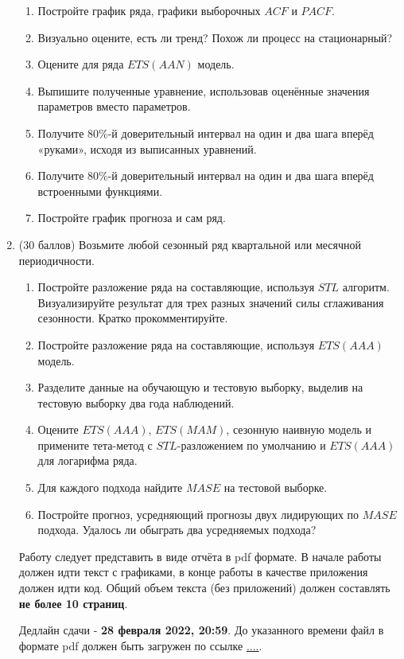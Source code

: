 \documentclass[12pt]{article}
\begin{document}
\begin{enumerate}
\begin{enumerate}
    \item Постройте график ряда, графики выборочных $ACF$ и $PACF$.
    \item Визуально оцените, есть ли тренд? Похож ли процесс на стационарный?
    \item Оцените для ряда $ETS(AAN)$ модель. 
    \item Выпишите полученные уравнение, использовав оценённые значения параметров вместо параметров.
    \item Получите 80\%-й доверительный интервал на один и два шага вперёд «руками», исходя из выписанных уравнений. 
    \item Получите 80\%-й доверительный интервал на один и два шага вперёд встроенными функциями.
    \item Постройте график прогноза и сам ряд. 
\end{enumerate}

\newpage

\item  (30 баллов) Возьмите любой сезонный ряд квартальной или месячной периодичности. 

\begin{enumerate}
    \item Постройте разложение ряда на составляющие, используя $STL$ алгоритм. 
    Визуализируйте результат для трех разных значений силы сглаживания сезонности. Кратко прокомментируйте.
    
    \item Постройте разложение ряда на составляющие, используя $ETS(AAA)$ модель. 
    
    \item Разделите данные на обучающую и тестовую выборку, выделив на тестовую выборку два года наблюдений. 
    
    \item Оцените $ETS(AAA)$, $ETS(MAM)$, сезонную наивную модель и примените тета-метод с $STL$-разложением по умолчанию и $ETS(AAA)$ для логарифма ряда. 
    
    \item Для каждого подхода найдите $MASE$ на тестовой выборке.
    
    \item Постройте прогноз, усредняющий прогнозы двух лидирующих по $MASE$ подхода. Удалось ли обыграть два усредняемых подхода?
    
\end{enumerate}



Работу следует представить в виде отчёта в pdf формате. 
В начале работы должен идти текст с графиками, в конце работы в качестве приложения должен идти код. 
Общий объем текста (без приложений) должен составлять \textbf{не более 10 страниц}.

Дедлайн сдачи - \textbf{28 февраля 2022, 20:59}. До указанного времени файл в формате pdf должен быть загружен по ссылке
\url{....}.

\end{enumerate}
\end{document}
